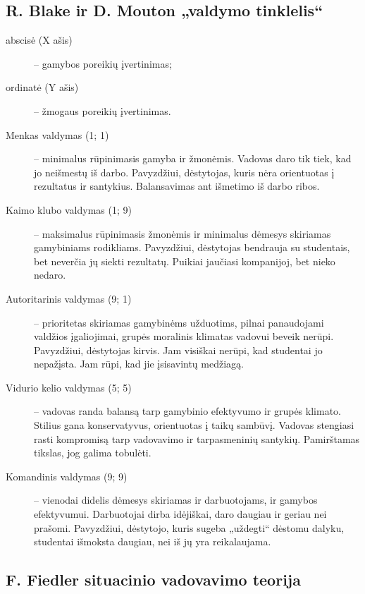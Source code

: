 \subsection{R. Blake ir D. Mouton „valdymo tinklelis“}

\begin{description}
  \item[abscisė (X ašis)] – gamybos poreikių įvertinimas;
  \item[ordinatė (Y ašis)] – žmogaus poreikių įvertinimas.
\end{description}

\begin{description}
  \item[Menkas valdymas (1; 1)] – minimalus rūpinimasis gamyba ir žmonėmis.
    Vadovas daro tik tiek, kad jo neišmestų iš darbo. Pavyzdžiui,
    dėstytojas, kuris nėra orientuotas į rezultatus ir santykius.
    Balansavimas ant išmetimo iš darbo ribos.
  \item[Kaimo klubo valdymas (1; 9)] – maksimalus rūpinimasis žmonėmis
    ir minimalus dėmesys skiriamas gamybiniams rodikliams. Pavyzdžiui,
    dėstytojas bendrauja su studentais, bet neverčia jų siekti
    rezultatų. Puikiai jaučiasi kompanijoj, bet nieko nedaro.
  \item[Autoritarinis valdymas (9; 1)] – prioritetas skiriamas gamybinėms
    užduotims, pilnai panaudojami valdžios įgaliojimai, grupės moralinis
    klimatas vadovui beveik nerūpi. Pavyzdžiui, dėstytojas kirvis.
    Jam visiškai nerūpi, kad studentai jo nepažįsta. Jam rūpi, kad jie
    įsisavintų medžiagą.
  \item[Vidurio kelio valdymas (5; 5)] – vadovas randa balansą tarp
    gamybinio efektyvumo ir grupės klimato. Stilius gana konservatyvus,
    orientuotas į taikų sambūvį. Vadovas stengiasi rasti kompromisą
    tarp vadovavimo ir tarpasmeninių santykių. Pamirštamas tikslas,
    jog galima tobulėti.
  \item[Komandinis valdymas (9; 9)] – vienodai didelis dėmesys skiriamas
    ir darbuotojams, ir gamybos efektyvumui. Darbuotojai dirba idėjiškai,
    daro daugiau ir geriau nei prašomi. Pavyzdžiui, dėstytojo, kuris
    sugeba „uždegti“ dėstomu dalyku, studentai išmoksta daugiau, nei
    iš jų yra reikalaujama.
\end{description}

\subsection{F. Fiedler situacinio vadovavimo teorija}

